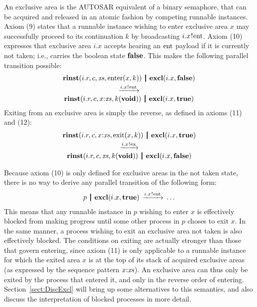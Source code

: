 \documentclass[twocolumn]{article}
\begin{document}
An exclusive area is the AUTOSAR equivalent of a binary semaphore, that can be acquired and released in an atomic fashion by competing runnable instances. Axiom (9) states that a runnable instance wishing to enter exclusive area $x$ may successfully proceed to its continuation $k$ by broadcasting $i.x \mspace{1mu}!\mspace{1mu} \mathrm{ent}$. Axiom (10) expresses that exclusive area $i.x$ accepts hearing an ${\mathrm{ent}}$ payload if it is currently not taken; i.e., carries the boolean state $\textbf{false}$. This makes the following parallel transition possible:
$$
\begin{array}{c}
	\Trinst {i.r} c \Xs {\TrteEnter x k}
	\Opar
	\Texcl {i.x} \Tfalse \vspace{0.6ex} \\ 
	\red {\say {i.x} \Tent} \\
	\Trinst {i.r} c {\Tcons x \Xs} {\Tap k \Tvoid}
	\Opar
	\Texcl {i.x} \Ttrue
\end{array}
$$
Exiting from an exclusive area is simply the reverse, as defined in axioms (11) and (12):
$$
\begin{array}{c}
	\Trinst {i.r} c {\Tcons x \Xs} {\TrteExit x k}
	\Opar
	\Texcl {i.x} \Ttrue \vspace{0.6ex} \\ 
	\red {\say {i.x} \Tex} \\
	\Trinst {i.r} c \Xs {\Tap k \Tvoid}
	\Opar
	\Texcl {i.x} \Tfalse
\end{array}
$$

Because axiom (10) is only defined for exclusive areas in the not taken state, there is no way to derive any parallel transition of the following form:
$$
\begin{array}{c}
	p \Opar {\Texcl {i.x} \Ttrue} \red{\say{i.x}{\Tent}} \ldots \\
\end{array}
$$
This means that any runnable instance in $p$ wishing to enter $x$ is effectively blocked from making progress until some other process in $p$ choses to exit $x$. In the same manner, a process wishing to exit an exclusive area not taken is also effectively blocked. The conditions on exiting are actually stronger than those that govern entering, since axiom (11) is only applicable to a runnable instance for which the exited area $x$ is at the top of its stack of acquired exclusive areas (as expressed by the sequence pattern $\Tcons x \Xs$). An exclusive area can thus only be exited by the process that entered it, and only in the reverse order of entering. Section~\ref{sect:DiscExcl} will bring up some alternatives to this semantics, and also discuss the interpretation of blocked processes in more detail.
\end{document}
